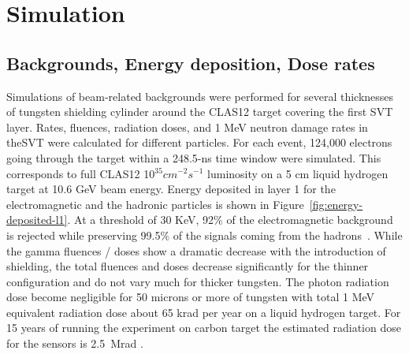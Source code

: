 \section{Simulation}



\subsection{Backgrounds, Energy deposition, Dose rates}
Simulations of beam-related backgrounds were performed for several thicknesses of tungsten shielding cylinder around the CLAS12 target covering the first SVT layer. Rates, fluences, radiation doses, and 1 MeV neutron damage rates in theSVT were calculated for different particles. For each event, 124,000 electrons going through the target within a 248.5-ns time window were simulated. This corresponds to full CLAS12 10$^{35} cm^{-2}s^{-1}$ luminosity on a 5 cm liquid hydrogen target at 10.6 GeV beam energy. 
Energy deposited in layer 1 for the electromagnetic and the hadronic particles is shown in Figure~\ref{fig:energy-deposited-l1}. At a threshold of 30 KeV, 92$\%$ of the electromagnetic background is rejected while preserving  99.5$\%$ of the signals coming from the hadrons~\cite{TDRSVT}.
While the gamma fluences / doses show a dramatic decrease with the introduction of shielding, the total fluences and doses decrease significantly for the thinner configuration and do not vary much for thicker tungsten. The photon radiation dose become negligible for 50 microns or more of tungsten with total 1 MeV equivalent radiation dose about 65 krad per year on a liquid hydrogen target. For 15 years of running the experiment on carbon target the estimated radiation dose for the sensors is 2.5~Mrad \cite{TDRSVT}. 


